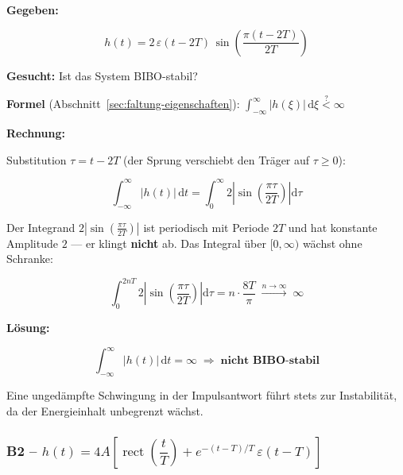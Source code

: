 \begin{beispiel}

\textbf{Gegeben:}

$$
h(t) = 2\,\varepsilon(t-2T)\,\sin\!\left(\frac{\pi(t-2T)}{2T}\right)
$$

\textbf{Gesucht:} Ist das System BIBO-stabil?

\textbf{Formel} (Abschnitt~\ref{sec:faltung-eigenschaften}):
$\displaystyle\int_{-\infty}^{\infty} |h(\xi)|\,\mathrm{d}\xi \stackrel{?}{<} \infty$

\textbf{Rechnung:}

Substitution $\tau = t - 2T$ (der Sprung verschiebt den Träger auf $\tau \geq 0$):

$$
\int_{-\infty}^{\infty} |h(t)|\,\mathrm{d}t
= \int_{0}^{\infty} 2\left|\sin\!\left(\frac{\pi\tau}{2T}\right)\right|\mathrm{d}\tau
$$

Der Integrand $2\left|\sin\!\left(\tfrac{\pi\tau}{2T}\right)\right|$ ist periodisch mit Periode
$2T$ und hat konstante Amplitude $2$ — er klingt \textbf{nicht} ab. Das Integral über $[0,\infty)$
wächst ohne Schranke:

$$
\int_{0}^{2nT} 2\left|\sin\!\left(\frac{\pi\tau}{2T}\right)\right|\mathrm{d}\tau
= n \cdot \frac{8T}{\pi} \;\xrightarrow{n\to\infty}\; \infty
$$

\textbf{Lösung:}

$$
\boxed{\int_{-\infty}^{\infty}|h(t)|\,\mathrm{d}t = \infty \;\Rightarrow\; \textbf{nicht BIBO-stabil}}
$$

Eine ungedämpfte Schwingung in der Impulsantwort führt stets zur Instabilität, da
der Energieinhalt unbegrenzt wächst.

\end{beispiel}

\subsubsection*{B2 – $h(t) = 4A\!\left[\operatorname{rect}\!\left(\dfrac{t}{T}\right) + e^{-(t-T)/T}\,\varepsilon(t-T)\right]$}

